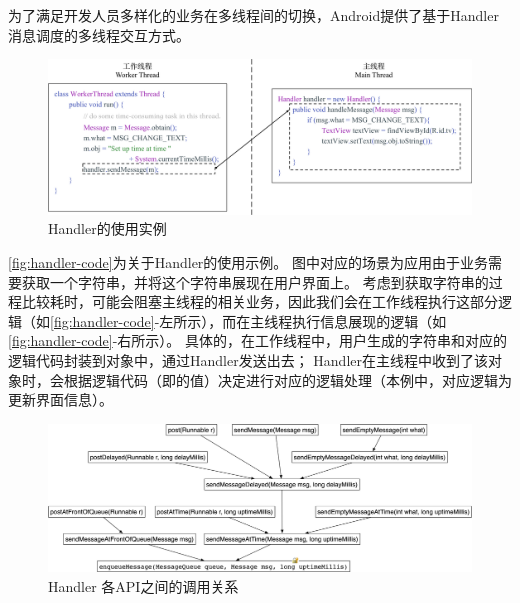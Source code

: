 为了满足开发人员多样化的业务在多线程间的切换，Android提供了基于Handler消息调度的多线程交互方式。



\begin{figure}[h]
	\centering
	\includegraphics[width=\textwidth]{./Figures/handler-code.png}
	\caption{Handler的使用实例}
	\label{fig:handler-code}
\end{figure}


\autoref{fig:handler-code}为关于Handler的使用示例。
图中对应的场景为应用由于业务需要获取一个字符串，并将这个字符串展现在用户界面上。
考虑到获取字符串的过程比较耗时，可能会阻塞主线程的相关业务，因此我们会在工作线程执行这部分逻辑（如\autoref{fig:handler-code}-左所示），而在主线程执行信息展现的逻辑（如\autoref{fig:handler-code}-右所示）。
具体的，在工作线程中，用户生成的字符串和对应的逻辑代码封装到对象中，通过Handler发送出去；
Handler在主线程中收到了该对象时，会根据逻辑代码（即的值）决定进行对应的逻辑处理（本例中，对应逻辑为更新界面信息）。





\begin{figure}[hb]
	\centering
	\includegraphics[width=\textwidth]{./Figures/Handler-apis.png}
	\caption{ Handler 各API之间的调用关系}
	\label{fig:handler-apis}
\end{figure}


